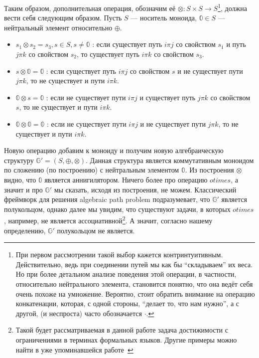 Таким образом, дополнительная операция, обозначим её $\otimes: S \times S \to S$\footnote{При первом рассмотрении такой выбор кажется контринтуитивным. Действительно, ведь при соединении путей мы как бы ``складываем'' их веса. Но при более детальном анализе поведения этой операции, в частности, относительно нейтрального элемента, становится понятно, что она ведёт себя очень похоже на умножение. Вероятно, стоит обратить внимание на операцию конкатенации, которая, с одной стороны, ``делает то, что нам нужно'', а с другой, (и неспроста) часто обозначается $\cdot$.}, должна вести себя следующим образом. Пусть $S$ --- носитель моноида, $\mathbb{0} \in S$ --- нейтральный элемент относительно $\oplus$.  
\begin{itemize}\label{itm:otimesIntro}
  \item $s_1 \otimes s_2 = s_3, s \in S, s \neq \mathbb{0}$ : если существует путь $i \pi j$ со свойством $s_1$ и путь $j \pi k$ со свойством $s_2$, то существует путь $i \pi k$ со свойством $s_3$.
  \item $s \otimes \mathbb{0} = \mathbb{0}$ : если существует путь $i \pi j$ со свойством $s$ и не существует пути $j \pi k$, то не существует и пути $i \pi k$.
  \item $\mathbb{0} \otimes s = \mathbb{0}$ : если не существует пути $i \pi j$ и существует путь $j \pi k$ со свойством $s$, то не существует и пути $i \pi k$.
  \item $\mathbb{0} \otimes \mathbb{0} = \mathbb{0}$ : если не существует пути $i \pi j$ и не существует пути $j \pi k$, то не существует и пути $i \pi k$.
\end{itemize}

Новую операцию добавим к моноиду и получим новую алгебраическую структуру $\mathbb{G}' = (S, \oplus,\otimes)$. Данная структура является коммутативным моноидом по сложению (по построению) с нейтральным элементом $\mathbb{0}$. Из построения $\otimes$ видно, что $\mathbb{0}$ является аннигилятором. Ничего более про операцию $otimes$, а значит и про $\mathbb{G}'$ мы сказать, исходя из построения, не можем. Классический фреймворк для решения algebraic path problem подразумевает, что $\mathbb{G}'$ является полукольцом, однако далее мы увидим, что существуют задачи, в которых $otimes$, например, не является ассоциативной\footnote{Такой будет рассматриваемая в данной работе задача достижимости с ограничениями в терминах формальных языков. Другие примеры можно найти в уже упоминавшейся работе~\cite{Baras2010PathPI}}. А значит, согласно нашему определению, $\mathbb{G}'$ полукольцом не является. 

